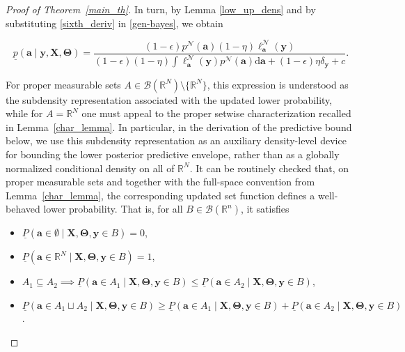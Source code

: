 \documentclass[12pt, english, oneside, a4paper]{article}
\newcommand{\y}{\boldsymbol{y}}
\newcommand{\X}{\boldsymbol{X}}
\renewcommand{\a}{\boldsymbol{a}}
\newcommand{\bT}{\boldsymbol{\Theta}}
\begin{document}
\begin{proof}[Proof of Theorem~\ref{main_th}]
In turn, by Lemma \ref{low_up_dens} and by substituting \eqref{sixth_deriv} in \eqref{gen-bayes}, we obtain

$$\underline{p}(\a \mid \y, \X,\bT)=\frac{(1-\epsilon)p^\mathcal{N}(\a) (1-\eta) \ell^\mathcal{N}_{\a}(\y)}{(1-\epsilon)(1-\eta)\int \ell^\mathcal{N}_{\a}(\y) p^\mathcal{N}(\a) \text{d}\a + (1-\epsilon)\eta \delta_{\y} + c}.$$





For proper measurable sets $A\in\mathcal{B}(\mathbb{R}^N)\setminus\{\mathbb{R}^N\}$, this expression is understood as the subdensity representation associated with the updated lower probability, while for $A=\mathbb{R}^N$ one must appeal to the proper setwise characterization recalled in Lemma~\ref{char_lemma}. In particular, in the derivation of the predictive bound below, we use this subdensity representation as an auxiliary density-level device for bounding the lower posterior predictive envelope, rather than as a globally normalized conditional density on all of $\mathbb{R}^N$. It can be routinely checked that, on proper measurable sets and together with the full-space convention from Lemma~\ref{char_lemma}, the corresponding updated set function defines a well-behaved lower probability. That is, for all $B \in \mathcal{B}(\mathbb{R}^n)$, it satisfies 

\begin{itemize}
    \item[(i)] $\underline{P}(\a \in \emptyset \mid \X,\bT,\y\in B)=0$,
    \item[(ii)] $\underline{P}(\a \in \mathbb{R}^N \mid \X,\bT,\y\in B)=1$,
    \item[(iii)] $A_1 \subseteq A_2 \implies \underline{P}(\a \in A_1 \mid \X,\bT,\y\in B) \leq \underline{P}(\a \in A_2 \mid \X,\bT,\y\in B)$,
    \item[(iv)] $\underline{P}(\a \in A_1 \sqcup A_2 \mid \X,\bT,\y\in B) \geq \underline{P}(\a \in A_1 \mid \X,\bT,\y\in B) + \underline{P}(\a \in A_2 \mid \X,\bT,\y\in B)$. 
\end{itemize}



\end{proof}
\end{document}
